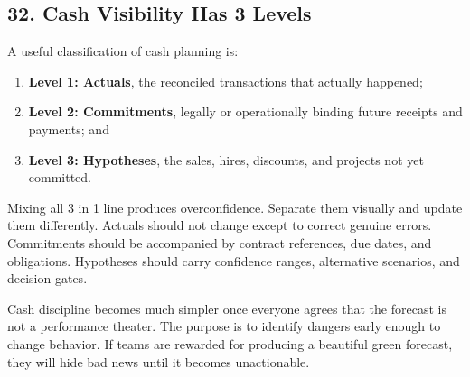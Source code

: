 \subsection*{32. Cash Visibility Has 3 Levels}

A useful classification of cash planning is:
\begin{enumerate}
\item \textbf{Level 1: Actuals}, the reconciled transactions that actually happened;
\item \textbf{Level 2: Commitments}, legally or operationally binding future receipts and payments; and
\item \textbf{Level 3: Hypotheses}, the sales, hires, discounts, and projects not yet committed.
\end{enumerate}

Mixing all 3 in 1 line produces overconfidence. Separate them visually and update them differently. Actuals should not change except to correct genuine errors. Commitments should be accompanied by contract references, due dates, and obligations. Hypotheses should carry confidence ranges, alternative scenarios, and decision gates.

Cash discipline becomes much simpler once everyone agrees that the forecast is not a performance theater. The purpose is to identify dangers early enough to change behavior. If teams are rewarded for producing a beautiful green forecast, they will hide bad news until it becomes unactionable.
